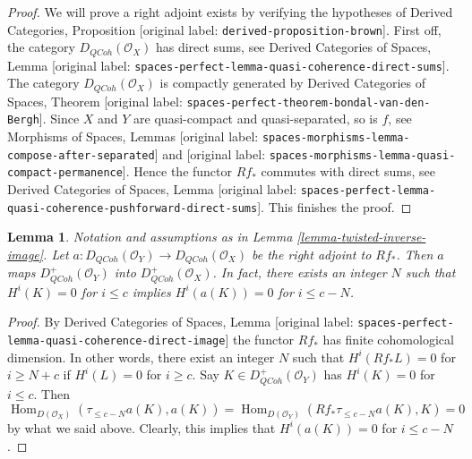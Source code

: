 \documentclass[10pt,a4paper]{article}
\theoremstyle{plain}
\newtheorem{lemma}[subsection]{Lemma}
\theoremstyle{definition}
\theoremstyle{remark}
\numberwithin{equation}{subsection}
\def\Hom{\mathop{\mathrm{Hom}}\nolimits}
\def\QCoh{\mathit{QCoh}}
\begin{document}
\begin{proof}
We will prove a right adjoint exists by verifying the hypotheses of
Derived Categories, Proposition \textnormal{[original label: \nolinkurl{derived-proposition-brown}]}.
First off, the category $D_\QCoh(\mathcal{O}_X)$ has direct sums, see
Derived Categories of Spaces, Lemma
\textnormal{[original label: \nolinkurl{spaces-perfect-lemma-quasi-coherence-direct-sums}]}.
The category $D_\QCoh(\mathcal{O}_X)$ is compactly generated by
Derived Categories of Spaces, Theorem
\textnormal{[original label: \nolinkurl{spaces-perfect-theorem-bondal-van-den-Bergh}]}.
Since $X$ and $Y$ are quasi-compact and quasi-separated, so is $f$, see
Morphisms of Spaces, Lemmas
\textnormal{[original label: \nolinkurl{spaces-morphisms-lemma-compose-after-separated}]} and
\textnormal{[original label: \nolinkurl{spaces-morphisms-lemma-quasi-compact-permanence}]}.
Hence the functor $Rf_*$ commutes with direct sums, see
Derived Categories of Spaces, Lemma
\textnormal{[original label: \nolinkurl{spaces-perfect-lemma-quasi-coherence-pushforward-direct-sums}]}.
This finishes the proof.
\end{proof}

\begin{lemma}
\label{lemma-twisted-inverse-image-bounded-below}
Notation and assumptions as in Lemma \ref{lemma-twisted-inverse-image}.
Let $a : D_\QCoh(\mathcal{O}_Y) \to D_\QCoh(\mathcal{O}_X)$ be the right
adjoint to $Rf_*$. Then $a$ maps
$D^+_\QCoh(\mathcal{O}_Y)$ into $D^+_\QCoh(\mathcal{O}_X)$.
In fact, there exists an integer $N$ such that
$H^i(K) = 0$ for $i \leq c$ implies $H^i(a(K)) = 0$ for $i \leq c - N$.
\end{lemma}

\begin{proof}
By Derived Categories of Spaces, Lemma
\textnormal{[original label: \nolinkurl{spaces-perfect-lemma-quasi-coherence-direct-image}]}
the functor $Rf_*$ has finite cohomological dimension. In other words,
there exist an integer $N$ such that
$H^i(Rf_*L) = 0$ for $i \geq N + c$ if $H^i(L) = 0$ for $i \geq c$.
Say $K \in D^+_\QCoh(\mathcal{O}_Y)$ has $H^i(K) = 0$ for $i \leq c$.
Then
$$
\Hom_{D(\mathcal{O}_X)}(\tau_{\leq c - N}a(K), a(K)) =
\Hom_{D(\mathcal{O}_Y)}(Rf_*\tau_{\leq c - N}a(K), K) = 0
$$
by what we said above. Clearly, this implies that
$H^i(a(K)) = 0$ for $i \leq c - N$.
\end{proof}
\end{document}
